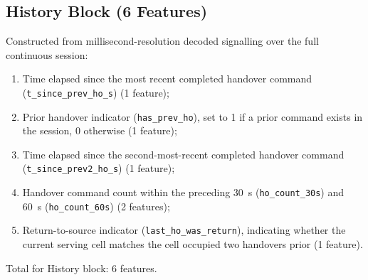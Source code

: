 \subsection{History Block (6 Features)}
Constructed from millisecond-resolution decoded signalling over the full continuous session:
\begin{enumerate}
    \item Time elapsed since the most recent completed handover command (\texttt{t\_since\_prev\_ho\_s}) (1 feature);
    \item Prior handover indicator (\texttt{has\_prev\_ho}), set to 1 if a prior command exists in the session, 0 otherwise (1 feature);
    \item Time elapsed since the second-most-recent completed handover command (\texttt{t\_since\_prev2\_ho\_s}) (1 feature);
    \item Handover command count within the preceding 30~s (\texttt{ho\_count\_30s}) and 60~s (\texttt{ho\_count\_60s}) (2 features);
    \item Return-to-source indicator (\texttt{last\_ho\_}\allowbreak\texttt{was\_return}), indicating whether the current serving cell matches the cell occupied two handovers prior (1 feature).
\end{enumerate}
Total for History block: 6 features.

